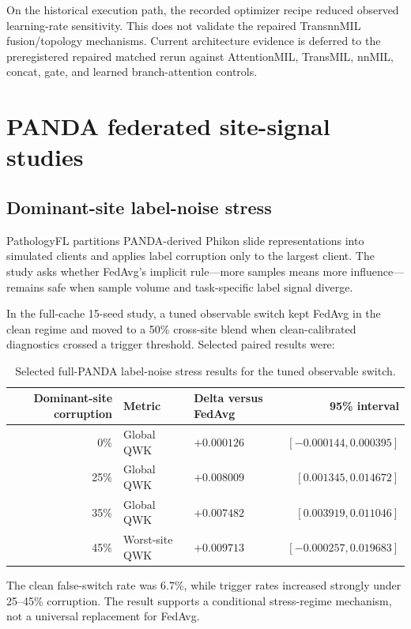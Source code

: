 On the historical execution path, the recorded optimizer recipe reduced observed learning-rate sensitivity. This does not validate the repaired TransnnMIL fusion/topology mechanisms. Current architecture evidence is deferred to the preregistered repaired matched rerun against AttentionMIL, TransMIL, nnMIL, concat, gate, and learned branch-attention controls.

\section{PANDA federated site-signal studies}

\subsection{Dominant-site label-noise stress}
PathologyFL partitions PANDA-derived Phikon slide representations into simulated clients and applies label corruption only to the largest client. The study asks whether FedAvg's implicit rule---more samples means more influence---remains safe when sample volume and task-specific label signal diverge.

In the full-cache 15-seed study, a tuned observable switch kept FedAvg in the clean regime and moved to a 50\% cross-site blend when clean-calibrated diagnostics crossed a trigger threshold. Selected paired results were:
\begin{table}[!htbp]
\centering
\caption{Selected full-PANDA label-noise stress results for the tuned observable switch.}
\small
\begin{tabular}{rllr}
\toprule
Dominant-site corruption & Metric & Delta versus FedAvg & 95\% interval \\
\midrule
0\% & Global QWK & $+0.000126$ & $[-0.000144,0.000395]$ \\
25\% & Global QWK & $+0.008009$ & $[0.001345,0.014672]$ \\
35\% & Global QWK & $+0.007482$ & $[0.003919,0.011046]$ \\
45\% & Worst-site QWK & $+0.009713$ & $[-0.000257,0.019683]$ \\
\bottomrule
\end{tabular}
\label{tab:panda_label_noise}
\end{table}
\FloatBarrier

The clean false-switch rate was 6.7\%, while trigger rates increased strongly under 25--45\% corruption. The result supports a conditional stress-regime mechanism, not a universal replacement for FedAvg.

